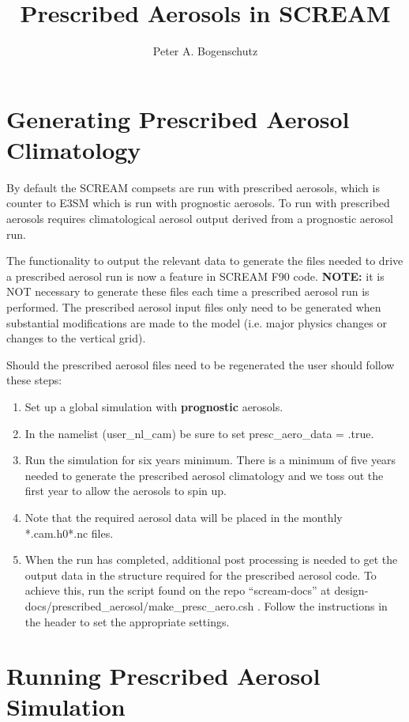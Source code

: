 \documentclass[12pt,titlepage]{article}
\title{Prescribed Aerosols in SCREAM}
\author{Peter A. Bogenschutz}
\numberwithin{equation}{section}
\begin{document}
\maketitle 

\section{Generating Prescribed Aerosol Climatology}

By default the SCREAM compsets are run with prescribed aerosols, which is counter to E3SM which is run with prognostic aerosols.  To run with prescribed aerosols requires climatological aerosol output derived from a prognostic aerosol run.  

The functionality to output the relevant data to generate the files needed to drive a prescribed aerosol run is now a feature in SCREAM F90 code.  \textbf{NOTE:} it is NOT necessary to generate these files each time a prescribed aerosol run is performed.  The prescribed aerosol input files only need to be generated when substantial modifications are made to the model (i.e. major physics changes or changes to the vertical grid).  

Should the prescribed aerosol files need to be regenerated the user should follow these steps:
\begin{enumerate}
  \item Set up a global simulation with \textbf{prognostic} aerosols.
  \item In the namelist (user\_nl\_cam) be sure to set presc\_aero\_data = .true.  
  \item Run the simulation for six years minimum.  There is a minimum of five years needed to generate the prescribed aerosol climatology and we toss out the first year to allow the aerosols to spin up.  
  \item Note that the required aerosol data will be placed in the monthly *.cam.h0*.nc files.
  \item When the run has completed, additional post processing is needed to get the output data in the structure required for the prescribed aerosol code.  To achieve this, run the script found on the repo \enquote{scream-docs} at design-docs/prescribed\_aerosol/make\_presc\_aero.csh .  Follow the instructions in the header to set the appropriate settings.  
\end{enumerate}

\section{Running Prescribed Aerosol Simulation}
\end{document}
